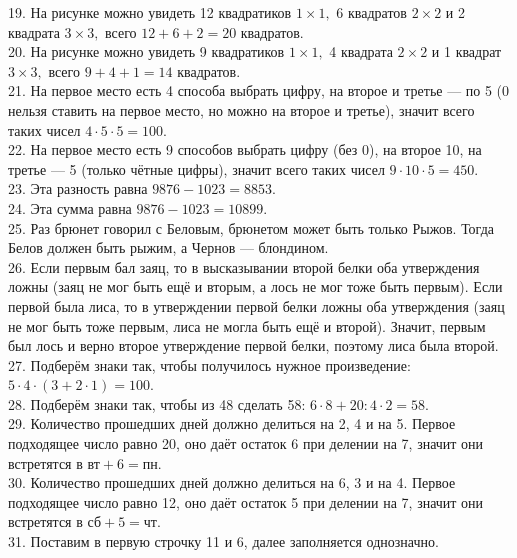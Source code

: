 \documentclass[12pt]{article}
\begin{document}
19. На рисунке можно увидеть 12 квадратиков $1\times1,$ 6 квадратов $2\times2$ и 2 квадрата $3\times3,$ всего $12+6+2=20$ квадратов.\\
20. На рисунке можно увидеть 9 квадратиков $1\times1,$ 4 квадрата $2\times2$ и 1 квадрат $3\times3,$ всего $9+4+1=14$ квадратов.\\
21. На первое место есть 4 способа выбрать цифру, на второе и третье --- по 5 (0 нельзя ставить на первое место, но можно на второе и третье), значит всего таких чисел $4\cdot5\cdot5=100.$\\
22. На первое место есть 9 способов выбрать цифру (без 0), на второе 10, на третье --- 5 (только чётные цифры), значит всего таких чисел $9\cdot10\cdot5=450.$\\
23. Эта разность равна $9876-1023=8853.$\\
24. Эта сумма равна $9876-1023=10899.$\\
25. Раз брюнет говорил с Беловым, брюнетом может быть только Рыжов. Тогда Белов должен быть рыжим, а Чернов --- блондином.\\
26. Если первым бал заяц, то в высказывании второй белки оба утверждения ложны (заяц не мог быть ещё и вторым, а лось не мог тоже быть первым). Если первой была лиса, то в утверждении первой белки ложны оба утверждения (заяц не мог быть тоже первым, лиса не могла быть ещё и второй). Значит, первым был лось и верно второе утверждение первой белки, поэтому лиса была второй.\\
27. Подберём знаки так, чтобы получилось нужное произведение: $5\cdot4\cdot(3+2\cdot1) = 100.$\\
28. Подберём знаки так, чтобы из 48 сделать 58: $6\cdot8+20:4\cdot2 = 58.$\\
29. Количество прошедших дней должно делиться на 2, 4 и на 5. Первое подходящее число равно 20, оно даёт остаток 6 при делении на 7, значит они встретятся в $\text{вт}+6=\text{пн}$.\\
30. Количество прошедших дней должно делиться на 6, 3 и на 4. Первое подходящее число равно 12, оно даёт остаток 5 при делении на 7, значит они встретятся в $\text{сб}+5=\text{чт}$.\\
31. Поставим в первую строчку 11 и 6, далее заполняется однозначно.
\begin{center}
\begin{figure}[ht!]
\end{figure}
\end{center}
\end{document}
